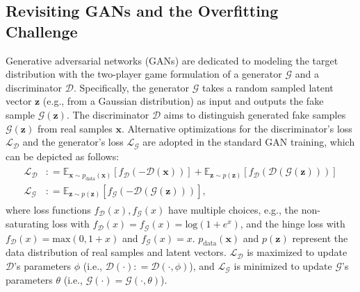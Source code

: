 \documentclass{article}
\newcommand{\Def}[0]{\mathrel{\mathop:}=}
\begin{document}
\subsection{Revisiting GANs and the Overfitting Challenge}
\vspace{-0.5em}
Generative adversarial networks (GANs) are dedicated to modeling the target distribution with the two-player game formulation of a generator $\mathcal{G}$ and a discriminator $\mathcal{D}$. Specifically, the generator $\mathcal{G}$ takes a random sampled latent vector $\boldsymbol{z}$ (e.g., from a Gaussian distribution)  as input and outputs the fake sample $\mathcal{G}(\boldsymbol{z})$. The discriminator $\mathcal{D}$ aims to distinguish generated fake samples $\mathcal{G}(\boldsymbol{z})$ from real samples $\boldsymbol{x}$. Alternative optimizations for the discriminator's loss $\mathcal{L}_{\mathcal{D}}$ and the generator's loss $\mathcal{L}_{\mathcal{G}}$ are adopted in the standard GAN training, which can be depicted as follows:
\begin{align}
    \begin{array}{ll}
    \mathcal{L}_{\mathcal{D}}&\Def\mathbb{E}_{\boldsymbol{x}\sim p_{\mathrm{data}}(\boldsymbol{x})}[f_{\mathcal{D}}(-\mathcal{D}(\boldsymbol{x}))] + \mathbb{E}_{\boldsymbol{z}\sim p(\boldsymbol{z})}[f_{\mathcal{D}}(\mathcal{D}(\mathcal{G}(\boldsymbol{z})))] \nonumber \\
\mathcal{L}_{\mathcal{G}}&\Def\mathbb{E}_{\boldsymbol{z}\sim p(\boldsymbol{z})}[f_{\mathcal{G}}(-\mathcal{D}(\mathcal{G}(\boldsymbol{z})))],
    \end{array} \label{eq:robust_feature}
\end{align}
where loss functions $f_{\mathcal{D}}(x),f_{\mathcal{G}}(x)$ have multiple choices, e.g., the non-saturating loss \cite{goodfellow2014generative} with $f_{\mathcal{D}}(x)=f_{\mathcal{G}}(x)=\mathrm{log}(1+e^x)$, and the hinge loss \cite{miyato2018spectral} with $f_{\mathcal{D}}(x)=\mathrm{max}(0,1+x)$ and $f_{\mathcal{G}}(x)=x$. $p_{\mathrm{data}}(\boldsymbol{x})$ and $p(\boldsymbol{z})$ represent the data distribution of real samples and latent vectors. $\mathcal{L}_{\mathcal{D}}$ is maximized to update $\mathcal{D}$'s parameters $\phi$ (i.e., $\mathcal{D}(\cdot)\Def\mathcal{D}(\cdot,\phi)$), and $\mathcal{L}_{\mathcal{G}}$ is minimized to update $\mathcal{G}$'s parameters $\theta$ (i.e., $\mathcal{G}(\cdot)=\mathcal{G}(\cdot,\theta)$). 
\end{document}
